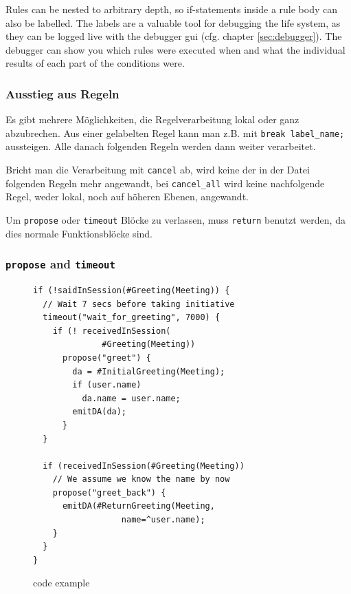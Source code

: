 %
Rules can be nested to arbitrary depth, so if-statements inside a rule body can also be labelled. The labels are a valuable tool for debugging the life system, as they can be logged live with the debugger gui (cfg. chapter \ref{sec:debugger}). The debugger can show you which rules were executed when and what the individual results of each part of the conditions were.



\subsubsection{Ausstieg aus Regeln}

Es gibt mehrere Möglichkeiten, die Regelverarbeitung lokal oder ganz
abzubrechen. Aus einer gelabelten Regel kann man z.B. mit
\verb|break label_name;| aussteigen. Alle danach folgenden Regeln werden dann
weiter verarbeitet.

Bricht man die Verarbeitung mit \texttt{cancel} ab, wird keine der in
der Datei folgenden Regeln mehr angewandt, bei \texttt{cancel\_all} wird
keine nachfolgende Regel, weder lokal, noch auf höheren Ebenen, angewandt.

Um \texttt{propose} oder \texttt{timeout} Blöcke zu verlassen, muss
\texttt{return} benutzt werden, da dies normale Funktionsblöcke sind.

\subsubsection{\texttt{propose} and \texttt{timeout}}
\begin{figure}[htb]
  \centering\small%
\begin{verbatim}
if (!saidInSession(#Greeting(Meeting)) {
  // Wait 7 secs before taking initiative
  timeout("wait_for_greeting", 7000) {
    if (! receivedInSession(
              #Greeting(Meeting))
      propose("greet") {
        da = #InitialGreeting(Meeting);
        if (user.name)
          da.name = user.name;
        emitDA(da);
      }
  }

  if (receivedInSession(#Greeting(Meeting))
    // We assume we know the name by now
    propose("greet_back") {
      emitDA(#ReturnGreeting(Meeting,
                  name=^user.name);
    }
  }
}
\end{verbatim}\vspace*{-3ex}
  \caption{\vonda code example}
  \label{fig:propose}
\end{figure}

